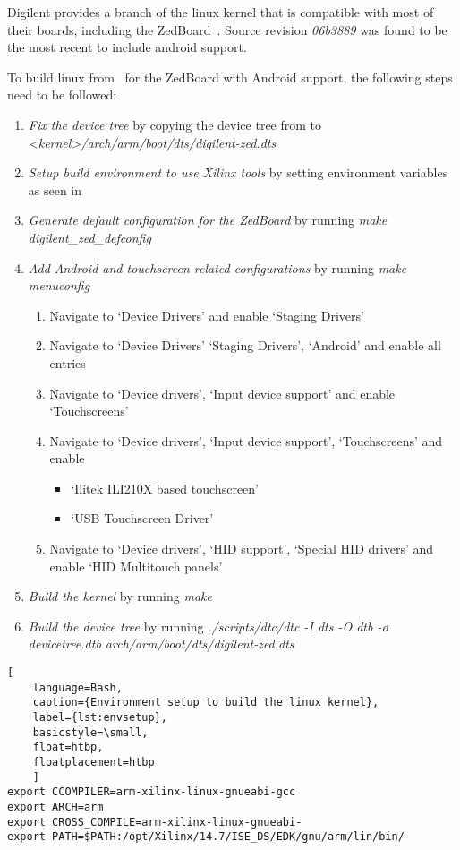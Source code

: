 Digilent provides a branch of the linux kernel that is compatible with most of
their boards, including the ZedBoard~\cite{DigilentLinux}.
Source revision \emph{06b3889} was found to be the most recent to include
android support.

To build linux from~\cite{DigilentLinux} for the ZedBoard with Android support,
the following steps need to be followed:
\begin{enumerate}
	\item \emph{Fix the device tree} by copying the device tree from
		\cite{DigilentReferenceDesign} to
		\emph{<kernel>/arch/arm/boot/dts/digilent-zed.dts}
	\item \emph{Setup build environment to use Xilinx tools} by setting
		environment variables as seen in 
	\item \emph{Generate default configuration for the ZedBoard} by running
		\emph{make digilent\_zed\_defconfig}
	\item \emph{Add Android and touchscreen related configurations} by running
		\emph{make menuconfig}
		\begin{enumerate}
			\item Navigate to `Device Drivers' and enable `Staging Drivers'
			\item Navigate to `Device Drivers' `Staging Drivers', `Android'
				and enable all entries
			\item Navigate to `Device drivers', `Input device support' and
				enable `Touchscreens'
			\item Navigate to `Device drivers', `Input device support',
				`Touchscreens' and enable
				\begin{itemize}
					\item `Ilitek ILI210X based touchscreen'
					\item `USB Touchscreen Driver'
				\end{itemize}
			\item Navigate to `Device drivers', `HID support', `Special HID
				drivers' and enable `HID Multitouch panels'
		\end{enumerate}
	\item \emph{Build the kernel} by running \emph{make}
	\item \emph{Build the device tree} by running \emph{./scripts/dtc/dtc -I dts
		-O dtb -o devicetree.dtb arch/arm/boot/dts/digilent-zed.dts}
\end{enumerate}
\begin{lstlisting}[
	language=Bash,
	caption={Environment setup to build the linux kernel},
	label={lst:envsetup},
	basicstyle=\small,
	float=htbp,
	floatplacement=htbp
	]
export CCOMPILER=arm-xilinx-linux-gnueabi-gcc
export ARCH=arm
export CROSS_COMPILE=arm-xilinx-linux-gnueabi-
export PATH=$PATH:/opt/Xilinx/14.7/ISE_DS/EDK/gnu/arm/lin/bin/		
\end{lstlisting}

